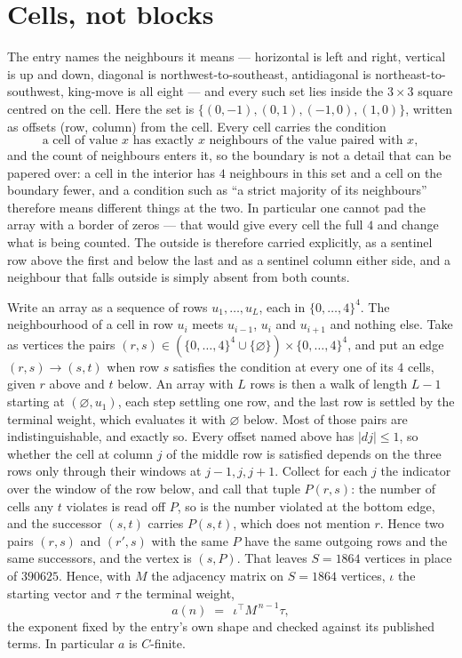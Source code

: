 \documentclass[11pt,a4paper]{article}
\theoremstyle{plain}
\theoremstyle{definition}
\begin{document}
\section{Cells, not blocks}

The entry names the neighbours it means --- horizontal is left and right, vertical is up and
down, diagonal is northwest-to-southeast, antidiagonal is northeast-to-southwest, king-move is
all eight --- and every such set lies inside the $3\times3$ square centred on the cell. Here
the set is $\{(0,-1), (0,1), (-1,0), (1,0)\}$, written as offsets (row, column) from the cell. Every cell carries
the condition
\[
\text{a cell of value }x\text{ has exactly }x\text{ neighbours of the value paired with }x,
\]
and the count of neighbours enters it, so the boundary is not a detail that can be papered
over: a cell in the interior has $4$ neighbours in this set and a cell on the boundary
fewer, and a condition such as ``a strict majority of its neighbours'' therefore means
different things at the two. In particular one cannot pad the array with a border of zeros ---
that would give every cell the full $4$ and change what is being counted. The outside is
therefore carried
explicitly, as a sentinel row above the first and below the last and as a sentinel column
either side, and a neighbour that falls outside is simply absent from both counts.

Write an array as a sequence of rows $u_1,\dots,u_L$, each in
$\{0,\dots,4\}^{4}$. The neighbourhood of a cell in row $u_i$ meets $u_{i-1}$,
$u_i$ and $u_{i+1}$ and nothing else. Take as vertices the pairs
$(r,s)\in(\{0,\dots,4\}^{4}\cup\{\varnothing\})\times\{0,\dots,4\}^{4}$,
and put an edge $(r,s)\to(s,t)$ when row $s$ satisfies the condition at every one of its
$4$ cells, given $r$ above and $t$ below. An array with $L$ rows is then a walk of length
$L-1$ starting at $(\varnothing,u_1)$, each step settling one row, and the last row is
settled by the terminal weight, which evaluates it with $\varnothing$ below. Most of those pairs are indistinguishable, and exactly so. Every offset named above has $|dj|\le 1$, so whether the cell at column $j$ of the middle row is satisfied depends on the three rows only through their windows at $j-1,j,j+1$. Collect for each $j$ the indicator over the window of the row below, and call that tuple $P(r,s)$: the number of cells any $t$ violates is read off $P$, so is the number violated at the bottom edge, and the successor $(s,t)$ carries $P(s,t)$, which does not mention $r$. Hence two pairs $(r,s)$ and $(r',s)$ with the same $P$ have the same outgoing rows and the same successors, and the vertex is $(s,P)$. That leaves $S=1864$ vertices in place of $390625$. Hence,
with $M$ the adjacency matrix on $S=1864$ vertices, $\iota$ the starting vector and $\tau$ the
terminal weight,
\[
a(n)\;=\;\,\iota^{\!\top}M^{\,n-1}\tau ,
\]
the exponent fixed by the entry's own shape and checked against its published terms. In
particular $a$ is $C$-finite.
\end{document}
